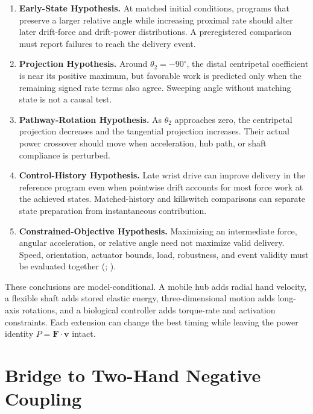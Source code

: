 \documentclass[
  letterpaper,
]{report}
\providecommand{\tightlist}{%
  \setlength{\itemsep}{0pt}\setlength{\parskip}{0pt}}
\begin{document}
\begin{enumerate}
\def\labelenumi{\arabic{enumi}.}
\tightlist
\item
  \textbf{Early-State Hypothesis.} At matched initial conditions,
  programs that preserve a larger relative angle while increasing
  proximal rate should alter later drift-force and drift-power
  distributions. A preregistered comparison must report failures to
  reach the delivery event.
\item
  \textbf{Projection Hypothesis.} Around \(\theta_2=-90^\circ\), the
  distal centripetal coefficient is near its positive maximum, but
  favorable work is predicted only when the remaining signed rate terms
  also agree. Sweeping angle without matching state is not a causal
  test.
\item
  \textbf{Pathway-Rotation Hypothesis.} As \(\theta_2\) approaches zero,
  the centripetal projection decreases and the tangential projection
  increases. Their actual power crossover should move when acceleration,
  hub path, or shaft compliance is perturbed.
\item
  \textbf{Control-History Hypothesis.} Late wrist drive can improve
  delivery in the reference program even when pointwise drift accounts
  for most force work at the achieved states. Matched-history and
  killswitch comparisons can separate state preparation from
  instantaneous contribution.
\item
  \textbf{Constrained-Objective Hypothesis.} Maximizing an intermediate
  force, angular acceleration, or relative angle need not maximize valid
  delivery. Speed, orientation, actuator bounds, load, robustness, and
  event validity must be evaluated together
  (;
  ).
\end{enumerate}

These conclusions are model-conditional. A mobile hub adds radial hand
velocity, a flexible shaft adds stored elastic energy, three-dimensional
motion adds long-axis rotations, and a biological controller adds
torque-rate and activation constraints. Each extension can change the
best timing while leaving the power identity
\(P=\mathbf F\cdot\mathbf v\) intact.

\section{Bridge to Two-Hand Negative
Coupling}\label{sec-two-hand-bridge}
\end{document}
